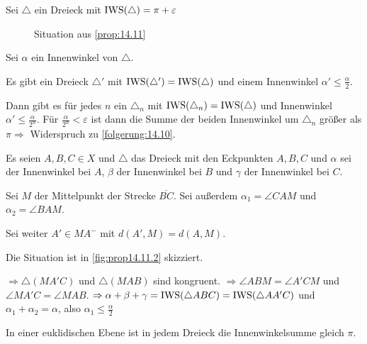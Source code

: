 \begin{beweis}
    Sei $\triangle$ ein Dreieck mit $\operatorname{IWS}(\triangle) = \pi + \varepsilon$

    \begin{figure}[ht]
        \centering
        \label{fig:prop14.11.0}
        \caption{Situation aus \cref{prop:14.11}}
    \end{figure}

    Sei $\alpha$ ein Innenwinkel von $\triangle$.

    \begin{behauptung}
        Es gibt ein Dreieck $\triangle'$ mit 
        $\operatorname{IWS}(\triangle') = \operatorname{IWS}(\triangle)$ und einem Innenwinkel
        $\alpha' \leq \frac{\alpha}{2}$.

        Dann gibt es für jedes $n$ ein $\triangle_n$ mit $\operatorname{IWS}(\triangle_n) = \operatorname{IWS}(\triangle)$
        und Innenwinkel $\alpha' \leq \frac{\alpha}{2^n}$. Für $\frac{\alpha}{2^n} < \varepsilon$
        ist dann die Summe der beiden Innenwinkel
        um $\triangle_n$ größer als $\pi \Rightarrow$ Widerspruch zu
        \cref{folgerung:14.10}.
    \end{behauptung}

    \begin{beweis}
        Es seien $A, B, C \in X$ und $\triangle $ das Dreieck mit den 
        Eckpunkten $A, B, C$ und $\alpha$ sei der Innenwinkel bei $A$, 
        $\beta$ der Innenwinkel bei $B$ und $\gamma$ der Innenwinkel bei $C$.

        Sei $M$ der Mittelpunkt der Strecke $\overline{BC}$. Sei außerdem
        $\alpha_1 = \angle CAM$ und $\alpha_2 = \angle BAM$.

        Sei weiter $A' \in MA^-$ mit $d(A', M) = d(A, M)$.

        Die Situation ist in \cref{fig:prop14.11.2} skizziert.

        $ \Rightarrow \triangle(MA'C)$ und
        $\triangle(MAB)$ sind kongruent.
        $\Rightarrow \angle ABM = \angle A'CM$ und $\angle MA'C = \angle MAB$.
        $\Rightarrow \alpha + \beta + \gamma =\operatorname{IWS}(\triangle ABC) = \operatorname{IWS}(\triangle AA'C)$
        und $\alpha_1 + \alpha_2 = \alpha$, also \obda $\alpha_1 \leq \frac{\alpha}{2}$
    \end{beweis}
\end{beweis}
\begin{bemerkung}\label{bem:14.12}%
    In einer euklidischen Ebene ist in jedem Dreieck die Innenwinkelsumme
    gleich $\pi$.
\end{bemerkung}

